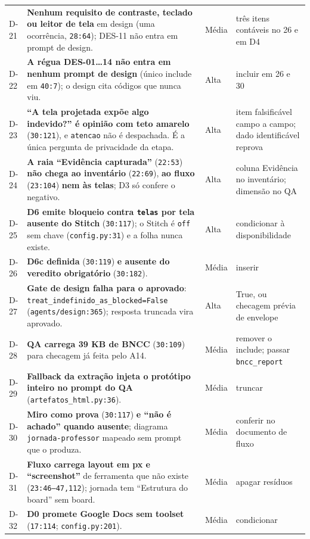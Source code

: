 \documentclass[11pt,a4paper]{article}
\begin{document}
\begin{longtable}{@{}p{0.9cm} >{\raggedright\arraybackslash}p{8.6cm} p{1.1cm} >{\raggedright\arraybackslash}p{4.9cm}@{}}
D-21 & \textbf{Nenhum requisito de contraste, teclado ou leitor de tela} em design (uma ocorrência, \texttt{28:64}); DES-11 não entra em prompt de design. & Média & três itens contáveis no 26 e em D4 \\
D-22 & \textbf{A régua DES-01\dots{}14 não entra em nenhum prompt de design} (único include em \texttt{40:7}); o design cita códigos que nunca viu. & Alta & incluir em 26 e 30 \\
D-23 & \textbf{``A tela projetada expõe algo indevido?'' é opinião com teto amarelo} (\texttt{30:121}), e \texttt{atencao} não é despachada. É a única pergunta de privacidade da etapa. & Alta & item falsificável campo a campo; dado identificável reprova \\
D-24 & \textbf{A raia ``Evidência capturada''} (\texttt{22:53}) \textbf{não chega ao inventário} (\texttt{22:69}), \textbf{ao fluxo} (\texttt{23:104}) \textbf{nem às telas}; D3 só confere o negativo. & Alta & coluna Evidência no inventário; dimensão no QA \\
D-25 & \textbf{D6 emite bloqueio contra \texttt{telas} por tela ausente do Stitch} (\texttt{30:117}); o Stitch é \texttt{off} sem chave (\texttt{config.py:31}) e a folha nunca existe. & Alta & condicionar à disponibilidade \\
D-26 & \textbf{D6c definida} (\texttt{30:119}) \textbf{e ausente do veredito obrigatório} (\texttt{30:182}). & Média & inserir \\
D-27 & \textbf{Gate de design falha para o aprovado}: \texttt{treat\_indefinido\_as\_blocked=False} (\texttt{agents/design:365}); resposta truncada vira aprovado. & Alta & True, ou checagem prévia de envelope \\
D-28 & \textbf{QA carrega 39 KB de BNCC} (\texttt{30:109}) para checagem já feita pelo A14. & Média & remover o include; passar \texttt{bncc\_report} \\
D-29 & \textbf{Fallback da extração injeta o protótipo inteiro no prompt do QA} (\texttt{artefatos\_html.py:36}). & Média & truncar \\
D-30 & \textbf{Miro como prova} (\texttt{30:117}) \textbf{e ``não é achado'' quando ausente}; diagrama \texttt{jornada-professor} mapeado sem prompt que o produza. & Média & conferir no documento de fluxo \\
D-31 & \textbf{Fluxo carrega layout em px e ``screenshot''} de ferramenta que não existe (\texttt{23:46--47,112}); jornada tem ``Estrutura do board'' sem board. & Média & apagar resíduos \\
D-32 & \textbf{D0 promete Google Docs sem toolset} (\texttt{17:114}; \texttt{config.py:201}). & Média & condicionar \\

\end{longtable}
\end{document}
